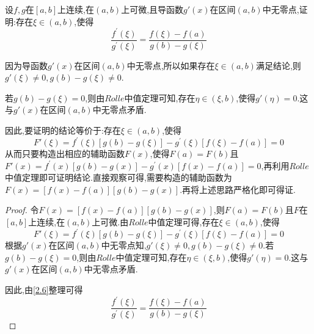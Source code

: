 \documentclass[lang=cn,newtx,10pt,scheme=chinese]{../Template/elegantbook}
\begin{document}
\begin{exercise}
设\(f,g\)在\([a,b]\)上连续,在\((a,b)\)上可微,且导函数\(g'(x)\)在区间\((a,b)\)中无零点,证明:存在\(\xi\in(a,b)\),使得
\begin{equation}
\frac{f^{\prime}(\xi)}{g^{\prime}(\xi)}=\frac{f(\xi)-f(a)}{g(b)-g(\xi)}
    \nonumber
\end{equation}

\begin{note}
    因为导函数\(g'(x)\)在区间\((a,b)\)中无零点,所以如果存在$\xi\in(a,b)$满足结论,则$g'(\xi)\ne0,g(b)-g(\xi)\ne0$.

    若$g(b)-g(\xi)=0$,则由$Rolle$中值定理可知,存在$\eta\in(\xi,b)$,使得$g'(\eta)=0$.这与\(g'(x)\)在区间\((a,b)\)中无零点矛盾.
    
    因此,要证明的结论等价于:存在$\xi\in(a,b)$,使得
    \begin{equation}
    F'(\xi)=f^{\prime}(\xi )\left[ g(b)-g(\xi ) \right] -g^{\prime}(\xi )\left[ f(\xi )-f(a) \right] =0
        \nonumber
    \end{equation}
    从而只要构造出相应的辅助函数$F(x)$,使得$F(a)=F(b)$且$F'(x)=f^{\prime}(x)\left[ g(b)-g(x) \right] -g^{\prime}(x)\left[ f(x)-f(a) \right] =0$,再利用$Rolle$中值定理即可证明结论.直接观察可得,需要构造的辅助函数为$F(x)=[f(x)-f(a)][g(b)-g(x)]$.再将上述思路严格化即可得证.
\end{note}

    \begin{proof}
    令$F(x)=[f(x)-f(a)][g(b)-g(x)]$,则$F(a)=F(b)$且\(F\)在\([a,b]\)上连续,在\((a,b)\)上可微.由$Rolle$中值定理可得,存在$\xi\in(a,b)$,使得
    \begin{equation}\label{2.6}
    F'(\xi)=f^{\prime}(\xi )\left[ g(b)-g(\xi ) \right] -g^{\prime}(\xi )\left[ f(\xi )-f(a) \right] =0
    \end{equation}
    根据$g'(x)$在区间$(a,b)$中无零点知,$g'(\xi)\ne0,g(b)-g(\xi)\ne0$.若$g(b)-g(\xi)=0$,则由$Rolle$中值定理可知,存在$\eta\in(\xi,b)$,使得$g'(\eta)=0$.这与\(g'(x)\)在区间\((a,b)\)中无零点矛盾.

    因此,由\eqref{2.6}整理可得
    \begin{equation}
\frac{f^{\prime}(\xi)}{g^{\prime}(\xi)}=\frac{f(\xi)-f(a)}{g(b)-g(\xi)}
    \nonumber
\end{equation}
    
\end{proof}
\end{exercise}
\end{document}
